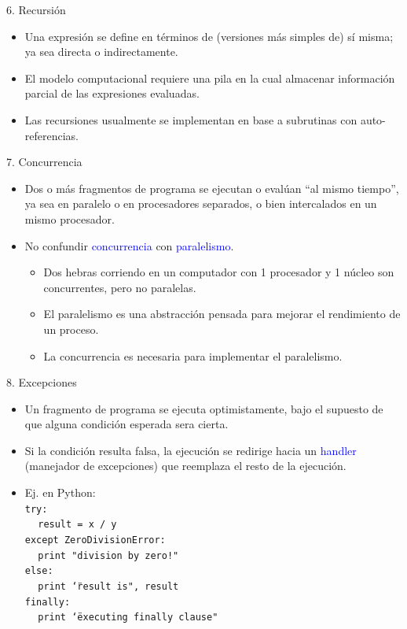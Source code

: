 \documentclass[handout]{beamer} %
\newcommand{\blue}[1]{\textcolor{blue}{#1}}
\begin{document}
\begin{frame}{6. Recursión}
  \begin{itemize}
    \item Una expresión se define en términos de (versiones más simples de) sí misma; ya sea directa o indirectamente.
    \item El modelo computacional requiere una pila en la cual almacenar información parcial de las expresiones evaluadas.
    \item Las recursiones usualmente se implementan en base a subrutinas con auto-referencias.
  \end{itemize}
\end{frame}

\begin{frame}{7. Concurrencia}
  \begin{itemize}
    \item<1-> Dos o más fragmentos de programa se ejecutan o evalúan ``al mismo tiempo'', ya sea en paralelo o en procesadores separados, o bien intercalados en un mismo procesador.
    \item<2-> No confundir \blue{concurrencia} con \blue{paralelismo}.
    \begin{itemize}
        \item<3-> Dos hebras corriendo en un computador con 1 procesador y 1 núcleo son concurrentes, pero no paralelas.
        \item<4-> El paralelismo es una abstracción pensada para mejorar el rendimiento de un proceso.
        \item<4-> La concurrencia es necesaria para implementar el paralelismo.
    \end{itemize}
  \end{itemize}
\end{frame}

\begin{frame}{8. Excepciones}
  \begin{itemize}
    \item<1-> Un fragmento de programa se ejecuta optimistamente, bajo el supuesto de que alguna condición esperada sera cierta.
    \item<1-> Si la condición resulta falsa, la ejecución se redirige hacia un \blue{handler} (manejador de excepciones) que reemplaza el resto de la ejecución.
    \item<2-> Ej. en Python:\\[1.5ex]
{\footnotesize
\texttt{try:}\\
\texttt{$~~~$ result = x / y}\\
\texttt{except ZeroDivisionError:}\\
\texttt{$~~~$ print "division by zero!"}\\
\texttt{else:}\\
\texttt{$~~~$ print \char`\"result is", result}\\
\texttt{finally:}\\
\texttt{$~~~$ print \char`\"executing finally clause"}}
  \end{itemize}
\end{frame}
\end{document}
